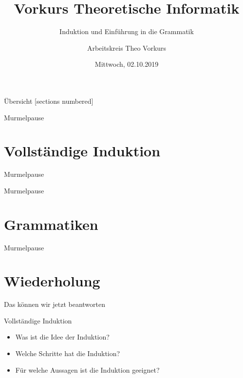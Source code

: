 

\title{Vorkurs Theoretische Informatik}
\subtitle{Induktion und Einführung in die Grammatik}
\date{Mittwoch, 02.10.2019}
\author{Arbeitskreis Theo Vorkurs}



\maketitle

\begin{frame}[fragile]{Übersicht}
  [sections numbered]
  \tableofcontents%
\end{frame}

\begin{frame}[standout]
  Murmelpause
\end{frame}

\section{Vollständige Induktion}



\begin{frame}[standout]
  Murmelpause
\end{frame}



\begin{frame}[standout]
  Murmelpause
\end{frame}

\section{Grammatiken}



\begin{frame}[standout]
  Murmelpause
\end{frame}



\section{Wiederholung} 
\begin{frame}[fragile]{Das können wir jetzt beantworten}
	\begin{alertblock}{Vollständige Induktion}
		\begin{itemize}
			\item Was ist die Idee der Induktion?
			\item Welche Schritte hat die Induktion? %
			\item Für welche Aussagen ist die Induktion geeignet?
		\end{itemize}
	\end{alertblock}
\end{frame}


